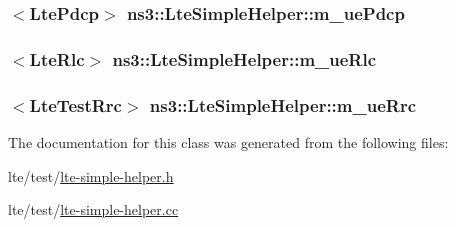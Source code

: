 \subsubsection[{\texorpdfstring{m\+\_\+ue\+Pdcp}{m_uePdcp}}]{$<${\bf Lte\+Pdcp}$>$ ns3\+::\+Lte\+Simple\+Helper\+::m\+\_\+ue\+Pdcp\hspace{0.3cm}{\ttfamily [private]}}\hypertarget{classns3_1_1LteSimpleHelper_aae46bc2f12634e6718f2ea5be639c5bb}{}\label{classns3_1_1LteSimpleHelper_aae46bc2f12634e6718f2ea5be639c5bb}
\subsubsection[{\texorpdfstring{m\+\_\+ue\+Rlc}{m_ueRlc}}]{$<${\bf Lte\+Rlc}$>$ ns3\+::\+Lte\+Simple\+Helper\+::m\+\_\+ue\+Rlc\hspace{0.3cm}{\ttfamily [private]}}\hypertarget{classns3_1_1LteSimpleHelper_aa23d8de7148db42babd25772a0625cb3}{}\label{classns3_1_1LteSimpleHelper_aa23d8de7148db42babd25772a0625cb3}
\subsubsection[{\texorpdfstring{m\+\_\+ue\+Rrc}{m_ueRrc}}]{$<${\bf Lte\+Test\+Rrc}$>$ ns3\+::\+Lte\+Simple\+Helper\+::m\+\_\+ue\+Rrc}\hypertarget{classns3_1_1LteSimpleHelper_a21a115de62aaa22c3278c1154057b5f2}{}\label{classns3_1_1LteSimpleHelper_a21a115de62aaa22c3278c1154057b5f2}


The documentation for this class was generated from the following files\+:\begin{DoxyCompactItemize}
\item 
lte/test/\hyperlink{lte-simple-helper_8h}{lte-\/simple-\/helper.\+h}\item 
lte/test/\hyperlink{lte-simple-helper_8cc}{lte-\/simple-\/helper.\+cc}\end{DoxyCompactItemize}
